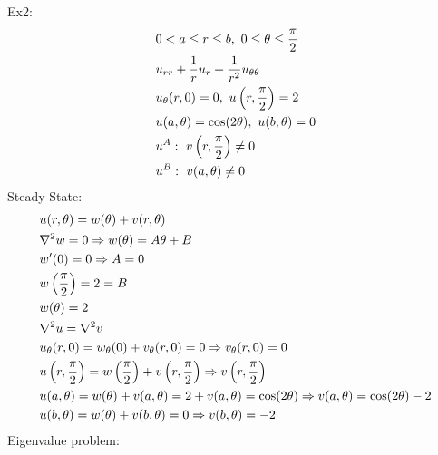 \documentclass[11pt, fleqn]{article}
\begin{document}
Ex2:
\begin{align*}
    &0<a\leq r\leq b,\ 0\leq\theta\leq\frac{\pi}{2}\\
    &u_{rr}+\frac{1}{r}u_r+\frac{1}{r^2}u_{\theta\theta}\\
    &u_\theta(r,0)=0,\ u\left( r,\frac{\pi}{2} \right)=2\\
    &u(a,\theta)=\cos(2\theta),\ u(b,\theta)=0\\
    &u^A:\ v\left( r,\frac{\pi}{2} \right)\neq 0\\
    &u^B:\ v(a,\theta)\neq 0
\end{align*}
Steady State:
\begin{align*}
    &u(r,\theta)=w(\theta)+v(r,\theta)\\
    &\nabla^2w=0\Rightarrow w(\theta)=A\theta+B\\
    &w'(0)=0\Rightarrow A=0\\
    &w\left( \frac{\pi}{2} \right)=2=B\\
    &w(\theta)=2\\
    &\nabla^2u=\nabla^2 v\\
    &u_\theta(r,0)=w_\theta(0)+v_\theta(r,0)=0\Rightarrow v_\theta(r,0)=0\\
    &u\left( r,\frac{\pi}{2} \right)=w\left( \frac{\pi}{2} \right)+v\left( r,\frac{\pi}{2} \right)\Rightarrow v\left( r,\frac{\pi}{2} \right)\\
    &u(a,\theta)=w(\theta)+v(a,\theta)=2+v(a,\theta)=\cos(2\theta)\Rightarrow v(a,\theta)=\cos(2\theta)-2\\
    &u(b,\theta)=w(\theta)+v(b,\theta)=0\Rightarrow v(b,\theta)=-2
\end{align*}
Eigenvalue problem:
\end{document}
